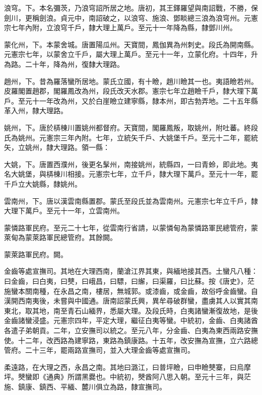 \begin{pinyinscope}
 浪穹。下。本名彌茨，乃浪穹詔所居之地。唐初，其王鐸羅望與南詔戰，不勝，保劍川，更稱劍浪。貞元中，南詔破之，以浪穹、施浪、鄧睒總三浪為浪穹州。元憲宗七年內附，立浪穹千戶，隸大理上萬戶。至元十一年降為縣，隸鄧川州。



 蒙化州，下。本蒙舍城。唐置陽瓜州。天寶間，鳳伽異為州刺史。段氏為開南縣。元憲宗七年，以蒙舍立千戶，屬大理上萬戶。至元十一年，立蒙化府。十四年，升為路。二十年，降為州，復隸大理路。



 趙州，下。昔為羅落蠻所居地。蒙氏立國，有十瞼，趙川瞼其一也。夷語瞼若州。皮羅閣置趙郡，閣羅鳳改為州，段氏改天水郡。憲宗七年立趙瞼千戶，隸大理下萬戶。至元十一年改為州，又於白崖瞼立建寧縣，隸本州，即古勃弄地。二十五年縣革入州，隸大理路。



 姚州，下。唐於梇棟川置姚州都督府。天寶間，閣羅鳳叛，取姚州，附吐蕃。終段氏為姚州。元憲宗三年內附。七年，立統矢千戶、大姚堡千戶。至元十二年，罷統矢，立姚州，隸大理路。領一縣：



 大姚，下。唐置西濮州，後更名髳州，南接姚州，統縣四，一曰青蛉，即此地。夷名大姚堡，與梇棟川相接。元憲宗七年，立千戶，隸大理下萬戶。至元十一年，罷千戶立大姚縣，隸姚州。



 雲南州，下。唐以漢雲南縣置郡。蒙氏至段氏並為雲南州。元憲宗七年立千戶，隸大理下萬戶。至元十一年，立雲南州。



 蒙憐路軍民府。至元二十七年，從雲南行省請，以蒙憐甸為蒙憐路軍民總管府，蒙萊甸為蒙萊路軍民總管府。其餘闕。



 蒙萊路軍民府。闕。



 金齒等處宣撫司。其地在大理西南，蘭滄江界其東，與緬地接其西。土蠻凡八種：曰金齒，曰白夷，曰僰，曰峨昌，曰驃，曰繲，曰渠羅，曰比蘇。按《唐史》，茫施蠻本關南種，在永昌之南，樓居，無城郭。或漆齒，或金齒，故俗呼金齒蠻。自漢開西南夷後，未嘗與中國通。唐南詔蒙氏興，異牟尋破群蠻，盡虜其人以實其南東北，取其地，南至青石山緬界，悉屬大理。及段氏時，白夷諸蠻漸復故地，是後金齒諸蠻浸盛。元憲宗四年，平定大理，繼征白夷等蠻。中統初，金齒、白夷諸酋各遣子弟朝貢。二年，立安撫司以統之。至元八年，分金齒、白夷為東西兩路安撫使。十二年，改西路為建寧路，東路為鎮康路。十五年，改安撫為宣撫，立六路總管府。二十三年，罷兩路宣撫司，並入大理金齒等處宣撫司。



 柔遠路，在大理之西，永昌之南。其地曰潞江，曰普坪瞼，曰申瞼僰寨，曰烏摩坪。僰蠻即《通典》所謂黑爨也。中統初，僰酋阿八思入朝。至元十三年，與茫施、鎮康、鎮西、平緬、麓川俱立為路，隸宣撫司。




\end{pinyinscope}
